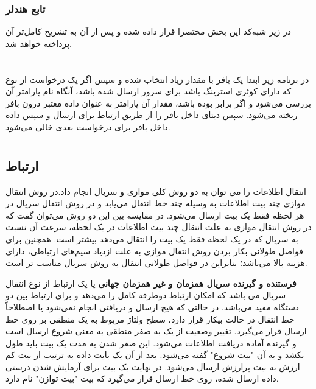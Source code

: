\subsubsection{تابع هندلر}
در زیر شبه‌کد این بخش مختصرا قرار داده شده و پس از آن به تشریح کامل‌تر آن پرداخته خواهد شد.
\section*{}
\begin{latin}
	
\end{latin}

در برنامه زیر ابتدا یک بافر
\noindent\unskip{}
با مقدار زیاد انتخاب شده و سپس اگر یک درخواست از نوع
که دارای کوئری استرینگ باشد برای سرور ارسال شده باشد، آنگاه نام پارامتر آن بررسی می‌شود و اگر برابر
بوده باشد، مقدار آن پارامتر به عنوان داده معتبر درون بافر ریخته می‌شود. سپس دیتای داخل بافر را از طریق ارتباط
برای
ارسال و سپس داده داخل بافر برای درخواست بعدی خالی می‌شود. 
\section*{}
\begin{latin}
	
\end{latin}

\subsection{ارتباط }
انتقال اطلاعات را می توان به دو روش کلی موازی و سریال انجام داد.در روش انتقال موازی چند بیت اطلاعات به وسیله چند خط انتقال می‌یابد و در روش انتقال سریال در هر لحظه فقط یک بیت ارسال می‌شود. در مقایسه بین این دو روش می‌توان گفت که در روش انتقال موازی به علت انتقال چند بیت اطلاعات در یک لحظه، سرعت آن نسبت به سریال که در یک لحظه فقط یک بیت را انتقال می‌دهد بیشتر است. همچنین برای فواصل طولانی بکار بردن روش انتقال موازی به علت ازدیاد سیم‌های ارتباطی، دارای هزینه بالا می‌باشد؛ بنابراین در فواصل طولانی انتقال به روش سریال مناسب تر است.

\textbf{فرستنده و گیرنده سریال همزمان و غیر همزمان جهانی} یا  یک ارتباط از نوع انتقال سریال می باشد که امکان ارتباط دوطرفه کامل را می‌دهد و برای ارتباط بین دو دستگاه مفید می‌باشد.
در حالتی که هیچ ارسال و دریافتی انجام نمی‌شود یا اصطلاحاً خط انتقال در حالت بیکار  قرار دارد، سطح ولتاژ مربوط به یک منطقی بر روی خط ارسال قرار می‌گیرد. تغییر وضعیت از یک به صفر منطقی به معنی شروع ارسال است و گیرنده آماده دریافت اطلاعات می‌شود. این صفر شدن به مدت یک بیت باید طول بکشد و به آن "بیت شروع" گفته می‌شود. بعد از آن یک بایت داده به ترتیب از بیت کم ارزش  به بیت پرارزش  ارسال می‌شود. در نهایت یک بیت برای آزمایش شدن درستی داده ارسال شده، روی خط ارسال قرار می‌گیرد که بیت "بیت توازن" نام دارد.

